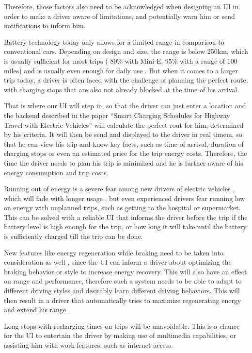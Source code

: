 Therefore, those factors also need to be acknowledged when designing an UI in order to make a driver aware of limitations, and potentially warn him or send notifications to inform him. 

Battery technology today only allows for a limited range in comparison to conventional cars. Depending on design and size, the range is below 250km, which is usually sufficient for most trips (\cite{driver-4} 80\% with Mini-E, \cite{driver-8} 95\% with a range of 100 miles) and is usually even enough for daily use \cite{driver-5} \cite{driver-6}. But when it comes to a larger trip today, a driver is often faced with the challenge of planning the perfect route, with charging stops that are also not already blocked at the time of his arrival.

That is where our UI will step in, so that the driver can just enter a location and the backend described in the paper ``Smart Charging Schedules for Highway Travel with Electric Vehicles'' \cite{driver-17} will calculate the perfect rout for him, determined by his criteria. It will then be send and displayed to the driver in real timem, so that he can view his trip and know key facts, such as time of arrival, duration of charging stops or even an estimated price for the trip energy costs. Therefore, the time the driver needs to plan his trip is minimized and he is further aware of his energy consumption and trip costs.

Running out of energy is a severe fear among new drivers of electric vehicles \cite{driver-5}, which will fade with longer usage \cite{driver-7}, but even experienced drivers fear running low on energy with unplanned trips, such as getting to the hospital or supermarket. This can be solved with a reliable UI that informs the driver before the trip if the battery level is high enough for the trip, or how long it will take until the battery is sufficiently charged till the trip can be done. 

New features like energy regeneration while braking need to be taken into consideration as well \cite{driver-6}, since the UI can inform a driver about optimizing the braking behavior or style to increase energy recovery. This will also have an effect on range and performance, therefore such a system needs to be able to adapt to different driving styles and desirably learn different driving behaviors. This will then result in a driver that automatically tries to maximize regenerating energy and extend his range \cite{driver-6}.

Long stops with recharging times on trips will be unavoidable. This is a chance for the UI to entertain the driver by making use of multimedia capabilities, or assisting him with work features, such as internet access. 

